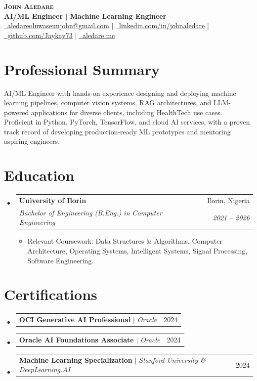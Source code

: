 \documentclass[letterpaper,10pt]{article}
\makeatletter
\newcommand{\resumeItem}[1]{
  \item\small{
    {#1 \vspace{-2pt}}
  }
}
\newcommand{\resumeSubheading}[4]{
  \vspace{-2pt}\item
    \begin{tabular*}{0.97\textwidth}[t]{l@{\extracolsep{\fill}}r}
      \textbf{#1} & #2 \\
      \textit{\small#3} & \textit{\small #4} \\
    \end{tabular*}\vspace{-7pt}
}
\newcommand{\resumeProjectHeading}[2]{
    \item
    \begin{tabular*}{0.97\textwidth}{l@{\extracolsep{\fill}}r}
      \small#1 & #2 \\
    \end{tabular*}\vspace{-7pt}
}
\newcommand{\resumeSubHeadingListStart}{\begin{itemize}[leftmargin=0.15in, label={}]}
\newcommand{\resumeSubHeadingListEnd}{\end{itemize}}
\newcommand{\resumeItemListStart}{\begin{itemize}}
\newcommand{\resumeItemListEnd}{\end{itemize}\vspace{-5pt}}
\makeatother
\begin{document}
\begin{center}
    \textbf{\Huge \scshape John Aledare} \\ \vspace{3pt}
    \small \textbf{AI/ML Engineer $|$ Machine Learning Engineer} \\ \vspace{2pt}
    \small 
    \href{mailto:aledareoluwaseunjohn@gmail.com}{\faEnvelope\ aledareoluwaseunjohn@gmail.com} $|$
    \href{https://linkedin.com/in/johnaledare}{\faLinkedin\ linkedin.com/in/johnaledare} $|$
    \href{https://github.com/Jaykay73}{\faGithub\ github.com/Jaykay73} $|$
    \href{https://aledare.me}{\faGlobe\ aledare.me}
\end{center}

\section{Professional Summary}
\begin{itemize}[leftmargin=0.15in, label={}]
    \small{\item{AI/ML Engineer with hands-on experience designing and deploying machine learning pipelines, computer vision systems, RAG architectures, and LLM-powered applications for diverse clients, including HealthTech use cases. Proficient in Python, PyTorch, TensorFlow, and cloud AI services, with a proven track record of developing production-ready ML prototypes and mentoring aspiring engineers.}}
\end{itemize}

\section{Education}
\resumeSubHeadingListStart
    \resumeSubheading
      {University of Ilorin}{Ilorin, Nigeria}
      {Bachelor of Engineering (B.Eng.) in Computer Engineering}{2021 -- 2026}
      \resumeItemListStart
        \resumeItem{Relevant Coursework: Data Structures \& Algorithms, Computer Architecture, Operating Systems, Intelligent Systems, Signal Processing, Software Engineering.}
      \resumeItemListEnd
\resumeSubHeadingListEnd

\section{Certifications}
\resumeSubHeadingListStart
    \resumeProjectHeading
      {\textbf{OCI Generative AI Professional} $|$ \emph{Oracle}}{2024}
    \resumeProjectHeading
      {\textbf{Oracle AI Foundations Associate} $|$ \emph{Oracle}}{2024}
    \resumeProjectHeading
      {\textbf{Machine Learning Specialization} $|$ \emph{Stanford University \& DeepLearning.AI}}{2024}
\resumeSubHeadingListEnd
\end{document}
